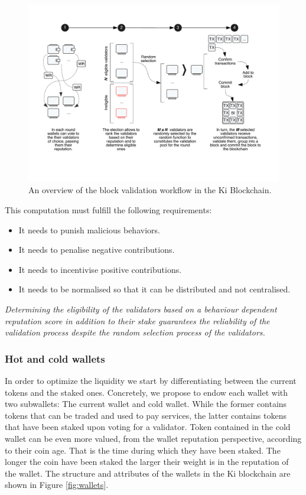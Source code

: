 \begin{figure}
	\includegraphics[width=\linewidth, trim= 1cm 3cm 1cm 2cm, clip]{Figures/workflow.pdf}
	\caption{An overview of the block validation workflow in the Ki Blockchain.}
	\label{fig:wf}
\end{figure}

This computation must fulfill the following requirements:
\begin{itemize}
	\item It needs to punish malicious behaviors.
	\item It needs to penalise negative contributions.
	\item It needs to incentivise positive contributions.
	\item It needs to be normalised so that it can be distributed and not centralised.
\end{itemize}

\textit{Determining the eligibility of the validators based on a behaviour dependent reputation score in addition to their stake guarantees the reliability of the validation process despite the random selection process of the validators.}

\subsubsection{Hot and cold wallets} In order to optimize the liquidity we start by differentiating between the current tokens and the staked ones. Concretely, we propose to endow each wallet with two subwallets: The current wallet and cold wallet. While the former contains tokens that can be traded and used to pay services, the latter contains tokens that have been staked upon voting for a validator. Token contained in the cold wallet can be even more valued, from the wallet reputation perspective, according to their coin age. That is the time during which they have been staked. The longer the coin have been staked the larger their weight is in the reputation of the wallet. The structure and attributes of the wallets in the Ki blockchain are shown in Figure \ref{fig:wallets}.  \\

